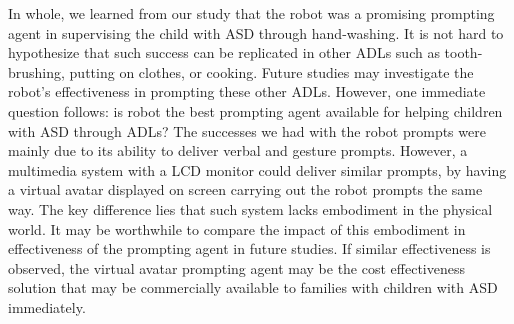 In whole, we learned from our study that the robot was a promising prompting agent in supervising the child with ASD through hand-washing.  It is not hard to hypothesize that such success can be replicated in other ADLs such as tooth-brushing, putting on clothes, or cooking.  Future studies may investigate the robot's effectiveness in prompting these other ADLs.  However, one immediate question follows: is robot the best prompting agent available for helping children with ASD through ADLs?  The successes we had with the robot prompts were mainly due to its ability to deliver verbal and gesture prompts.  However, a multimedia system with a LCD monitor could deliver similar prompts, by having a virtual avatar displayed on screen carrying out the robot prompts the same way.  The key difference lies that such system lacks embodiment in the physical world.  It may be worthwhile to compare the impact of this embodiment in effectiveness of the prompting agent in future studies.  If similar effectiveness is observed, the virtual avatar prompting agent may be the cost effectiveness solution that may be commercially available to families with children with ASD immediately.


